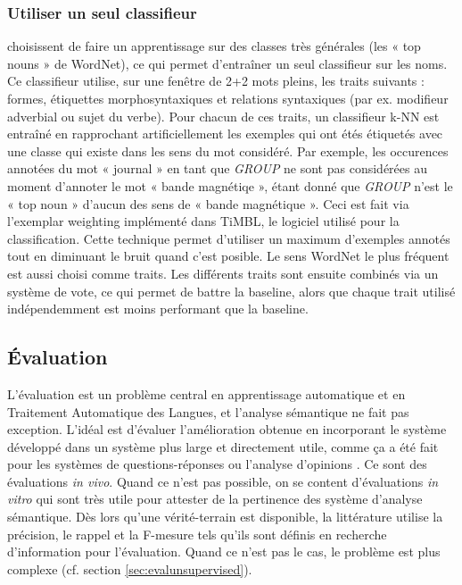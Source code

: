 \subsubsection{Utiliser un seul classifieur}

\cite{kohomban2005learning} choisissent de faire un apprentissage sur des
classes très générales (les « top nouns » de WordNet), ce qui permet
d'entraîner un seul classifieur sur les noms. Ce classifieur utilise, sur une
fenêtre de 2+2 mots pleins, les traits suivants : formes, étiquettes
morphosyntaxiques et relations syntaxiques (par ex. modifieur adverbial ou
sujet du verbe). Pour chacun de ces traits, un classifieur k-NN est entraîné en
rapprochant artificiellement les exemples qui ont étés étiquetés avec une
classe qui existe dans les sens du mot considéré. Par exemple, les occurences
annotées du mot « journal » en tant que \textit{GROUP} ne sont pas considérées
au moment d'annoter le mot « bande magnétiqe », étant donné que \textit{GROUP}
n'est le « top noun » d'aucun des sens de « bande magnétique ». Ceci est fait
via l'exemplar weighting implémenté dans TiMBL, le logiciel utilisé pour la
classification. Cette technique permet d'utiliser un maximum d'exemples annotés
tout en diminuant le bruit quand c'est posible. Le sens WordNet le plus
fréquent est aussi choisi comme traits. Les différents traits sont ensuite
combinés via un système de vote, ce qui permet de battre la baseline, alors que
chaque trait utilisé indépendemment est moins performant que la baseline.




\subsection{Évaluation}
\label{subsec:evaluation}


L'évaluation est un problème central en apprentissage automatique et en
Traitement Automatique des Langues, et l'analyse sémantique ne fait pas
exception. L'idéal est d'évaluer l'amélioration obtenue en incorporant le
système développé dans un système plus large et directement utile, comme ça a
été fait pour les systèmes de questions-réponses \citep{shen2007using} ou
l'analyse d'opinions \citep{das2012structure}. Ce sont des évaluations
\textit{in vivo}. Quand ce n'est pas possible, on se content d'évaluations
\textit{in vitro} qui sont très utile pour attester de la pertinence des
système d'analyse sémantique. Dès lors qu'une vérité-terrain est disponible, la
littérature utilise la précision, le rappel et la F-mesure tels qu'ils sont
définis en recherche d'information pour l'évaluation. Quand ce n'est pas le
cas, le problème est plus complexe (cf. section \ref{sec:evalunsupervised}).

